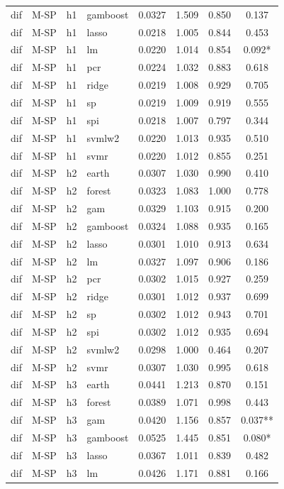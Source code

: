 \begin{ThreePartTable}
\begin{longtable}[t]{llclcccc}
dif & M-SP & h1 & gamboost & 0.0327 & 1.509 & 0.850 & 0.137\\
dif & M-SP & h1 & lasso & 0.0218 & 1.005 & 0.844 & 0.453\\
dif & M-SP & h1 & lm & 0.0220 & 1.014 & 0.854 & 0.092*\\
dif & M-SP & h1 & pcr & 0.0224 & 1.032 & 0.883 & 0.618\\
dif & M-SP & h1 & ridge & 0.0219 & 1.008 & 0.929 & 0.705\\
dif & M-SP & h1 & sp & 0.0219 & 1.009 & 0.919 & 0.555\\
dif & M-SP & h1 & spi & 0.0218 & 1.007 & 0.797 & 0.344\\
dif & M-SP & h1 & svmlw2 & 0.0220 & 1.013 & 0.935 & 0.510\\
dif & M-SP & h1 & svmr & 0.0220 & 1.012 & 0.855 & 0.251\\
\addlinespace
dif & M-SP & h2 & earth & 0.0307 & 1.030 & 0.990 & 0.410\\
dif & M-SP & h2 & forest & 0.0323 & 1.083 & 1.000 & 0.778\\
dif & M-SP & h2 & gam & 0.0329 & 1.103 & 0.915 & 0.200\\
dif & M-SP & h2 & gamboost & 0.0324 & 1.088 & 0.935 & 0.165\\
dif & M-SP & h2 & lasso & 0.0301 & 1.010 & 0.913 & 0.634\\
dif & M-SP & h2 & lm & 0.0327 & 1.097 & 0.906 & 0.186\\
dif & M-SP & h2 & pcr & 0.0302 & 1.015 & 0.927 & 0.259\\
dif & M-SP & h2 & ridge & 0.0301 & 1.012 & 0.937 & 0.699\\
dif & M-SP & h2 & sp & 0.0302 & 1.012 & 0.943 & 0.701\\
dif & M-SP & h2 & spi & 0.0302 & 1.012 & 0.935 & 0.694\\
dif & M-SP & h2 & svmlw2 & 0.0298 & 1.000 & 0.464 & 0.207\\
dif & M-SP & h2 & svmr & 0.0307 & 1.030 & 0.995 & 0.618\\
\addlinespace
dif & M-SP & h3 & earth & 0.0441 & 1.213 & 0.870 & 0.151\\
dif & M-SP & h3 & forest & 0.0389 & 1.071 & 0.998 & 0.443\\
dif & M-SP & h3 & gam & 0.0420 & 1.156 & 0.857 & 0.037**\\
dif & M-SP & h3 & gamboost & 0.0525 & 1.445 & 0.851 & 0.080*\\
dif & M-SP & h3 & lasso & 0.0367 & 1.011 & 0.839 & 0.482\\
dif & M-SP & h3 & lm & 0.0426 & 1.171 & 0.881 & 0.166\\

\end{longtable}
\end{ThreePartTable}
